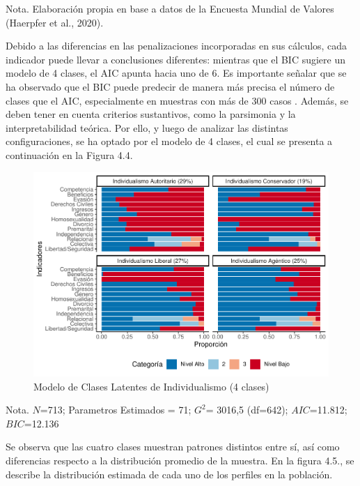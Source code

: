 \documentclass[12pt,twoside]{templates/facsothesis}
\begin{document}
Nota. Elaboración propia en base a datos de la Encuesta Mundial de Valores (Haerpfer et al., 2020).

Debido a las diferencias en las penalizaciones incorporadas en sus cálculos, cada indicador puede llevar a conclusiones diferentes: mientras que el BIC sugiere un modelo de 4 clases, el AIC apunta hacia uno de 6. Es importante señalar que se ha observado que el BIC puede predecir de manera más precisa el número de clases que el AIC, especialmente en muestras con más de 300 casos \citep{nylund2007}. Además, se deben tener en cuenta criterios sustantivos, como la parsimonia y la interpretabilidad teórica. Por ello, y luego de analizar las distintas configuraciones, se ha optado por el modelo de 4 clases, el cual se presenta a continuación en la Figura 4.4.

\begin{figure}[!ht]

{\centering \includegraphics[width=1\linewidth,]{tesis_files/figure-latex/unnamed-chunk-12-1} 

}

\caption{Modelo de Clases Latentes de Individualismo (4 clases)}\label{fig:unnamed-chunk-12}
\end{figure}
\FloatBarrier

Nota. \(N\)=713; Parametros Estimados = 71; \(G^2\)= 3016,5 (df=642); \(AIC\)=11.812; \(BIC\)=12.136

Se observa que las cuatro clases muestran patrones distintos entre sí, así como diferencias respecto a la distribución promedio de la muestra. En la figura 4.5., se describe la distribución estimada de cada uno de los perfiles en la población.
\end{document}
